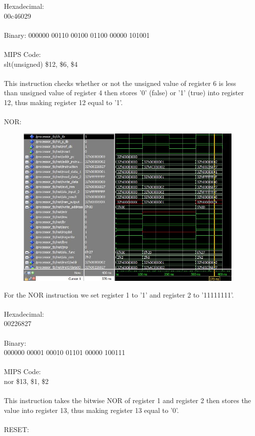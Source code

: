 \documentclass[paper=letter, fontsize=11pt]{scrartcl} %
\numberwithin{equation}{section}
\numberwithin{figure}{section}
\numberwithin{table}{section}
\begin{document}
Hexadecimal:
\\
00c46029
\\
\\
Binary:
000000 00110 00100 01100 00000 101001
\\
\\
MIPS Code:
\\
slt(unsigned) \$12, \$6, \$4
\\
\\
This instruction checks whether or not the unsigned value of register 6 is less than unsigned value of register 4 then stores '0' (false) or '1' (true) into register 12, thus making register 12 equal to '1'.
\\
\pagebreak
\\
NOR:

\begin{figure}[H]
	\centering
		\includegraphics[width=150mm]{../sim/photo/nor.JPG}
	\label{fig: NOR}
\end{figure}

For the NOR instruction we set register 1 to '1' and register 2 to '11111111'.
\\
\\
Hexadecimal:
\\
00226827
\\
\\
Binary:
\\
000000 00001 00010 01101 00000 100111
\\
\\
MIPS Code:
\\
nor \$13, \$1, \$2
\\
\\
This instruction takes the bitwise NOR of register 1 and register 2 then stores the value into register 13, thus making register 13 equal to '0'.
\\
\pagebreak
\\
RESET:
\end{document}
